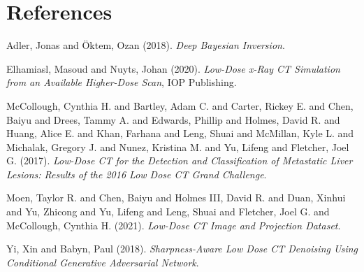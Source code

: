 \documentclass[a4paper, 11pt]{article}
\begin{document}
\section{References}
\label{sec:org75d9450}
\noindent
Adler, Jonas and Öktem, Ozan (2018). \emph{Deep {{Bayesian Inversion}}}.

\noindent
Elhamiasl, Masoud and Nuyts, Johan (2020). \emph{Low-Dose x-Ray {{CT}} Simulation from an Available Higher-Dose Scan}, IOP Publishing.

\noindent
McCollough, Cynthia H. and Bartley, Adam C. and Carter, Rickey E. and Chen, Baiyu and Drees, Tammy A. and Edwards, Phillip and Holmes, David R. and Huang, Alice E. and Khan, Farhana and Leng, Shuai and McMillan, Kyle L. and Michalak, Gregory J. and Nunez, Kristina M. and Yu, Lifeng and Fletcher, Joel G. (2017). \emph{Low-Dose {{CT}} for the Detection and Classification of Metastatic Liver Lesions: {{Results}} of the 2016 {{Low Dose CT Grand Challenge}}}.

\noindent
Moen, Taylor R. and Chen, Baiyu and Holmes III, David R. and Duan, Xinhui and Yu, Zhicong and Yu, Lifeng and Leng, Shuai and Fletcher, Joel G. and McCollough, Cynthia H. (2021). \emph{Low-Dose {{CT}} Image and Projection Dataset}.

\noindent
Yi, Xin and Babyn, Paul (2018). \emph{Sharpness-Aware {{Low}} Dose {{CT}} Denoising Using Conditional Generative Adversarial Network}.
\end{document}
